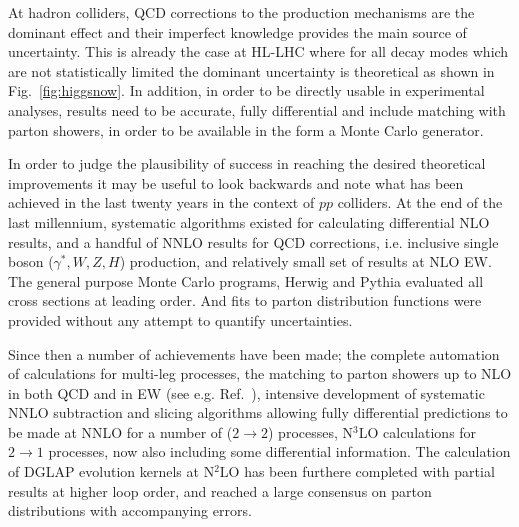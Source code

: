 \documentclass[../report.tex]{subfiles}
\begin{document}
At hadron colliders, QCD corrections to the production mechanisms are the dominant effect and their imperfect knowledge provides the main source of uncertainty. This is already the case 
at HL-LHC where for all decay modes which are not statistically limited the dominant uncertainty 
is theoretical as shown in Fig.~\ref{fig:higgsnow}. In addition, in order to be directly usable in experimental analyses, results need to be accurate, fully differential and include matching with parton showers, in order to be available in the form a Monte Carlo generator.

In order to judge the plausibility of success in reaching the desired theoretical improvements it may be useful to look backwards and note what has been achieved in the last twenty years in the context of $pp$ colliders. 
At the end of the last millennium, systematic algorithms existed for calculating differential NLO results, and a handful of NNLO results for QCD corrections, i.e. inclusive single boson ($\gamma^*,W,Z,H$) production, and relatively small set of results at NLO EW. The general purpose Monte Carlo programs, Herwig\cite{Corcella:1999qn} and Pythia\cite{Sjostrand:2000wi}
evaluated all cross sections at leading order. And fits to parton distribution functions were provided without any attempt to quantify uncertainties. 

Since then a number of achievements have been made; the complete automation of calculations for multi-leg processes, the matching to parton showers up to NLO in both QCD and in EW (see e.g. Ref.~\cite{Frederix:2018nkq,Alwall:2014hca}), 
intensive development of systematic NNLO subtraction and slicing algorithms
allowing fully differential predictions to be made at NNLO
for a number of ($2 \to 2$) processes, 
N$^{3}$LO calculations for $2 \to 1$ processes\cite{Mistlberger:2018etf}, now also including some differential information.
The calculation of DGLAP evolution kernels at N$^{2}$LO\cite{Vogt:2004mw,Moch:2004pa} has been furthere completed with partial results at higher loop order, and reached a large consensus on parton distributions with accompanying errors\cite{Butterworth:2015oua}. 
\end{document}
